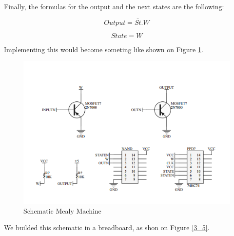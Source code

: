 Finally, the formulas for the output and the next states are the following:

\[
Output=\bar{St}.W
\]

\[
State=W
\]

Implementing this would become someting like shown on Figure \ref{3_4}.

\begin{figure}[H]
\begin{centering}
\includegraphics[scale=0.6]{../Exercise3/Assignment/images/Schematic2}
\par\end{centering}
\caption{Schematic Mealy Machine}
\label{3_4}

\end{figure}

We builded this schematic in a breadboard, as shon on Figure \ref{3_5}.

